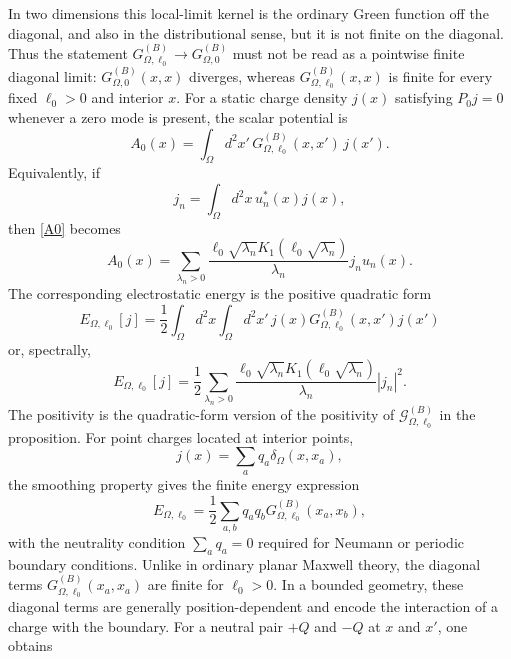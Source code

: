 \documentclass[openacc]{rsproca_new}%
\begin{document}
In two dimensions this local-limit kernel is the ordinary Green function off the diagonal, and also in the distributional sense, but it is not finite on the diagonal. Thus the statement $G_{\Omega,\ell_0}^{(B)}\to G_{\Omega,0}^{(B)}$ must not be read as a pointwise finite diagonal limit: $G_{\Omega,0}^{(B)}(x,x)$ diverges, whereas $G_{\Omega,\ell_0}^{(B)}(x,x)$ is finite for every fixed $\ell_0>0$ and interior $x$. For a static charge density $j(x)$ satisfying $P_0j=0$ whenever a zero mode is present, the scalar potential is
\begin{equation}\label{A0}
  A_0(x)=\int_\Omega d^2x'\,G_{\Omega,\ell_0}^{(B)}(x,x')\,j(x').
\end{equation}
Equivalently, if
\begin{equation}
  j_n=\int_\Omega d^2x\,u_n^*(x)j(x),
\end{equation}
then \eqref{A0} becomes
\begin{equation}
  A_0(x)=\sum_{\lambda_n>0}
  \frac{\ell_0\sqrt{\lambda_n}K_1(\ell_0\sqrt{\lambda_n})}{\lambda_n}
  j_n u_n(x).
\end{equation}
The corresponding electrostatic energy is the positive quadratic form
\begin{equation}
  E_{\Omega,\ell_0}[j]
  =\frac{1}{2}\int_\Omega d^2x\int_\Omega d^2x'\,
  j(x)G_{\Omega,\ell_0}^{(B)}(x,x')j(x')
\end{equation}
or, spectrally,
\begin{equation}
  E_{\Omega,\ell_0}[j]
  =\frac{1}{2}\sum_{\lambda_n>0}
  \frac{\ell_0\sqrt{\lambda_n}K_1(\ell_0\sqrt{\lambda_n})}{\lambda_n}|j_n|^2.
\end{equation}
The positivity is the quadratic-form version of the positivity of $\mathcal G_{\Omega,\ell_0}^{(B)}$ in the proposition. For point charges located at interior points,
\begin{equation}
  j(x)=\sum_a q_a\delta_\Omega(x,x_a),
\end{equation}
the smoothing property gives the finite energy expression
\begin{equation}
  E_{\Omega,\ell_0}=\frac{1}{2}\sum_{a,b}q_a q_b
  G_{\Omega,\ell_0}^{(B)}(x_a,x_b),
\end{equation}
with the neutrality condition $\sum_a q_a=0$ required for Neumann or periodic boundary conditions. Unlike in ordinary planar Maxwell theory, the diagonal terms $G_{\Omega,\ell_0}^{(B)}(x_a,x_a)$ are finite for $\ell_0>0$. In a bounded geometry, these diagonal terms are generally position-dependent and encode the interaction of a charge with the boundary. For a neutral pair $+Q$ and $-Q$ at $x$ and $x'$, one obtains
\end{document}
